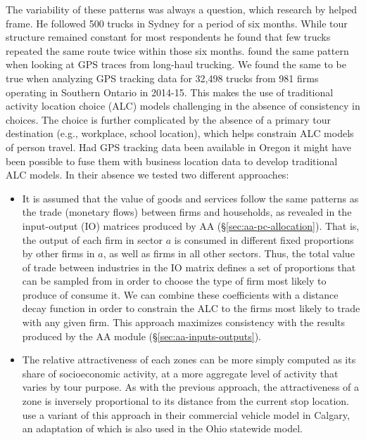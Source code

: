 The variability of these patterns was always a question, which research by \cite{figliozzi07a} helped frame. He followed 500 trucks in Sydney for a period of six months. While tour structure remained constant for most respondents he found that few trucks repeated the same route twice within those six months. \cite{sharman11} found the same pattern when looking at GPS traces from long-haul trucking. We found the same to be true when analyzing GPS tracking data for 32,498 trucks from 981 firms operating in Southern Ontario in 2014-15. This makes the use of traditional activity location choice (ALC) models challenging in the absence of consistency in choices. The choice is further complicated by the absence of a primary tour destination (e.g., workplace, school location), which helps constrain ALC models of person travel. Had GPS tracking data been available in Oregon it might have been possible to fuse them with business location data to develop traditional ALC models. In their absence we tested two different approaches:
\begin{itemize}
\item It is assumed that the value of goods and services follow the same patterns as the trade (monetary flows) between firms and households, as revealed in the input-output (IO) matrices produced by AA (\S\ref{sec:aa-pc-allocation}). That is, the output of each firm in sector $a$ is consumed in different fixed proportions by other firms in $a$, as well as firms in all other sectors. Thus, the total value of trade between industries in the IO matrix defines a set of proportions that can be sampled from in order to choose the type of firm most likely to produce of consume it. We can combine these coefficients with a distance decay function in order to constrain the ALC to the firms most likely to trade with any given firm. This approach maximizes consistency with the results produced by the AA module (\S\ref{sec:aa-inputs-outputs}).
\item The relative attractiveness of each zones can be more simply computed as its share of socioeconomic activity, at a more aggregate level of activity that varies by tour purpose. As with the previous approach, the attractiveness of a zone is inversely proportional to its distance from the current stop location. \cite{hunt07} use a variant of this approach in their commercial vehicle model in Calgary, an adaptation of which is also used in the Ohio statewide model. 
\end{itemize}

